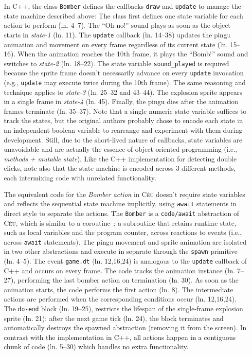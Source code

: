 \documentclass{vgtc}                          %
\newcommand{\CEU}{\textsc{C\'{e}u}\xspace}
\newcommand{\code}[1] {{\small{\texttt{#1}}}}
\begin{document}
In C++, the class \code{Bomber} defines the callbacks \code{draw} and
\code{update} to manage the state machine described above:
%
The class first defines one state variable for each action to perform
(ln. 4--7).
The ``Oh no!'' sound plays as soon as the object starts in \emph{state-1} 
(ln. 11).
The \code{update} callback (ln. 14--38) updates the pingu animation and
movement on every frame regardless of its current state (ln. 15--16).
When the animation reaches the 10th frame, it plays the ``Bomb!'' sound and 
switches to \emph{state-2} (ln. 18--22).
The state variable \code{sound\_played} is required because the sprite frame
doesn't necessarily advance on every \code{update} invocation (e.g.,
\code{update} may execute twice during the 10th frame).
The same reasoning and technique applies to \emph{state-3} (ln. 25--32 and
43--44).
The explosion sprite appears in a single frame in \emph{state-4} (ln. 45).
Finally, the pingu dies after the animation frames terminate (ln. 35--37).
%
Note that a single numeric state variable suffices to track the states, but the
original authors probably chose to encode each state in an independent boolean 
variable to rearrange and experiment with them during development.
Still, due to the short-lived nature of callbacks, state variables are 
unavoidable and are actually the essence of object-oriented programming
(i.e., \emph{methods + mutable state}).
%
Like the C++ implementation for detecting double clicks, note also that the
state machine is encoded across 3 different methods, each intermixing code with
unrelated functionality.

The equivalent code for the \emph{Bomber action} in \CEU doesn't require state
variables and reflects the sequential state machine implicitly, using
\code{await} statements in direct style to separate the actions.
%
The \code{Bomber} is a \code{code/await} abstraction of \CEU, which is similar
to a coroutine~\cite{sync_async.cooperative}: a subroutine that retains runtime
state, such as local variables and the program counter, across reactions to
events (i.e., across \code{await} statements).
The pingu movement and sprite animation are isolated in two other abstractions
and execute in separate through the \code{spawn} primitive (ln. 4--5).
The event \code{game.dt} (ln. 12,16,24) is analogous to the \code{update}
callback of C++ and occurs on every frame.
%
The code tracks the animation instance (ln. 7--27), performing the last bomber
action on termination (ln. 30).
As soon as the animation starts, the code performs the first action (ln. 8).
The intermediate actions are performed when the corresponding conditions occur
(ln. 12,16,24).
The \code{do-end} block (ln. 19--25), restricts the lifespan of the
single-frame explosion sprite (ln. 21): after the next game tick (ln. 24), the
block terminates and automatically destroys the spawned abstraction (removing
it from the screen).
%
In contrast with the implementation in C++, all actions happen in a contiguous
chunk of code (ln. 5--30) which handles no extra functionality.
\end{document}
